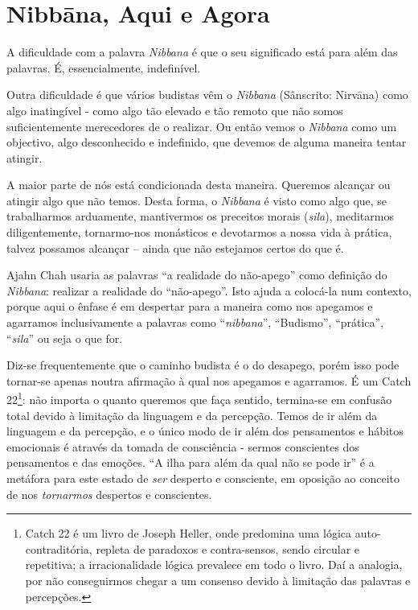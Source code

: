 \chapter{Nibbāna, Aqui e Agora}

A dificuldade com a palavra \emph{Nibbana} é que o seu significado está
para além das palavras. É, essencialmente, indefinível.

Outra dificuldade é que vários budistas vêm o \emph{Nibbana} (Sânscrito:
Nirvāna) como algo inatingível - como algo tão elevado e tão remoto que
não somos suficientemente merecedores de o realizar. Ou então vemos o
\emph{Nibbana} como um objectivo, algo desconhecido e indefinido, que
devemos de alguma maneira tentar atingir.

A maior parte de nós está condicionada desta maneira. Queremos alcançar
ou atingir algo que não temos. Desta forma, o \emph{Nibbana} é visto
como algo que, se trabalharmos arduamente, mantivermos os preceitos
morais (\emph{sila}), meditarmos diligentemente, tornarmo-nos monásticos
e devotarmos a nossa vida à prática, talvez possamos alcançar -- ainda
que não estejamos certos do que é.

Ajahn Chah usaria as palavras ``a realidade do não-apego'' como
definição do \emph{Nibbana}: realizar a realidade do ``não-apego''. Isto
ajuda a colocá-la num contexto, porque aqui o ênfase é em despertar para
a maneira como nos apegamos e agarramos inclusivamente a palavras como
``\emph{nibbana}'', ``Budismo'', ``prática'', ``\emph{sila}'' ou seja o
que for.

Diz-se frequentemente que o caminho budista é o do desapego, porém isso
pode tornar-se apenas noutra afirmação à qual nos apegamos e agarramos.
É um Catch 22\footnote{%
Catch 22 é um livro de Joseph Heller, onde predomina uma lógica
auto-contraditória, repleta de paradoxos e contra-sensos, sendo circular
e repetitiva; a irracionalidade lógica prevalece em todo o livro. Daí a
analogia, por não conseguirmos chegar a um consenso devido à limitação
das palavras e percepções.}:
não importa o quanto queremos que faça sentido,
termina-se em confusão total devido à limitação da linguagem e da
percepção. Temos de ir além da linguagem e da percepção, e o único modo
de ir além dos pensamentos e hábitos emocionais é através da tomada de
consciência - sermos conscientes dos pensamentos e das emoções. ``A ilha
para além da qual não se pode ir'' é a metáfora para este estado de
\emph{ser} desperto e consciente, em oposição ao conceito de nos
\emph{tornarmos} despertos e conscientes.

